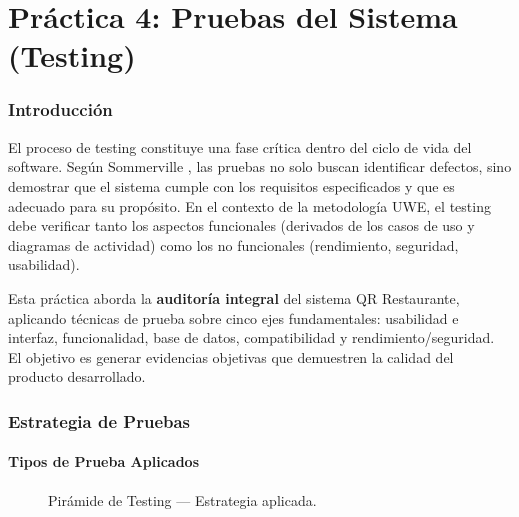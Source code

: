 \part{Práctica 4: Pruebas del Sistema (Testing)}

\section{Introducción}

El proceso de testing constituye una fase crítica dentro del ciclo de vida del software. Según Sommerville \cite{Sommerville2015}, las pruebas no solo buscan identificar defectos, sino demostrar que el sistema cumple con los requisitos especificados y que es adecuado para su propósito. En el contexto de la metodología UWE, el testing debe verificar tanto los aspectos funcionales (derivados de los casos de uso y diagramas de actividad) como los no funcionales (rendimiento, seguridad, usabilidad).

Esta práctica aborda la \textbf{auditoría integral} del sistema QR Restaurante, aplicando técnicas de prueba sobre cinco ejes fundamentales: usabilidad e interfaz, funcionalidad, base de datos, compatibilidad y rendimiento/seguridad. El objetivo es generar evidencias objetivas que demuestren la calidad del producto desarrollado.

\section{Estrategia de Pruebas}

\subsection{Tipos de Prueba Aplicados}

\begin{figure}[H]
    \centering
    \caption{Pirámide de Testing — Estrategia aplicada.}
    \label{fig:piramide_testing}
\end{figure}

